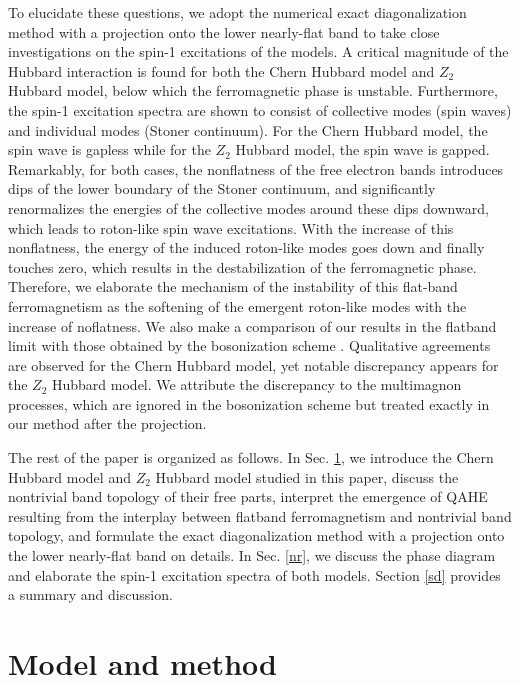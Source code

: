 \documentclass[amsmath,superscriptaddress,showpacs,aps,prb,twocolumn]{revtex4-1}
\begin{document}
\par To elucidate these questions, we adopt the numerical exact diagonalization method with a projection onto the lower nearly-flat band to take close investigations on the spin-1 excitations of the models. A critical magnitude of the Hubbard interaction is found for both the Chern Hubbard model and $Z_2$ Hubbard model, below which the ferromagnetic phase is unstable. Furthermore, the spin-1 excitation spectra are shown to consist of collective modes (spin waves) and individual modes (Stoner continuum). For the Chern Hubbard model, the spin wave is gapless while for the $Z_2$ Hubbard model, the spin wave is gapped. Remarkably, for both cases, the nonflatness of the free electron bands introduces dips of the lower boundary of the Stoner continuum, and significantly renormalizes the energies of the collective modes around these dips downward, which leads to roton-like spin wave excitations. With the increase of this nonflatness, the energy of the induced roton-like modes goes down and finally touches zero, which results in the destabilization of the ferromagnetic phase. Therefore, we elaborate the mechanism of the instability of this flat-band ferromagnetism as the softening of the emergent roton-like modes with the increase of noflatness. We also make a comparison of our results in the flatband limit with those obtained by the bosonization scheme \cite{DG_PRB2015}. Qualitative agreements are observed for the Chern Hubbard model, yet notable discrepancy appears for the $Z_2$ Hubbard model. We attribute the discrepancy to the multimagnon processes, which are ignored in the bosonization scheme but treated exactly in our method after the projection.

\par The rest of the paper is organized as follows. In Sec. \ref{mm}, we introduce the Chern Hubbard model and $Z_2$ Hubbard model studied in this paper, discuss the nontrivial band topology of their free parts, interpret the emergence of QAHE resulting from the interplay between flatband ferromagnetism and nontrivial band topology, and formulate the exact diagonalization method with a projection onto the lower nearly-flat band on details. In Sec. \ref{nr}, we discuss the phase diagram and elaborate the spin-1 excitation spectra of both models. Section \ref{sd} provides a summary and discussion.

\section{Model and method}\label{mm}
\end{document}
